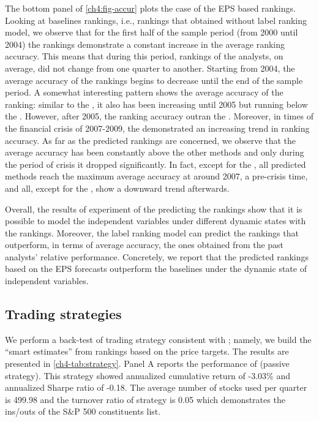 \documentclass[a4paper,twoside,12pt,openright,notitlepage]{report}\usepackage[]{graphicx}\usepackage[]{color}
\begin{document}
The bottom panel of \ref{ch4:fig-accur} plots the case of the EPS based rankings. Looking at baselines rankings, i.e., rankings that obtained without label ranking model, we observe that for the first half of the sample period (from 2000 until 2004) the \naive{} rankings  demonstrate a constant increase in the average ranking accuracy. This means that during this period, rankings of the analysts, on average, did not change from one quarter to another. Starting from 2004, the average accuracy of the \naive{} rankings begins to decrease until the end of the sample period. A somewhat interesting pattern shows the average accuracy of the  ranking: similar to the \naive{}, it also has been increasing until 2005 but running below the \naive{}. However, after 2005, the  ranking accuracy outran the \naive{}. Moreover, in times of the financial crisis of 2007-2009, the  demonstrated an increasing trend in ranking accuracy. As far as the predicted rankings are concerned, we observe that the \diff{} average accuracy has been constantly above the other methods and only during the period of crisis it dropped significantly. In fact, except for the \random{}, all predicted methods reach the maximum average accuracy at around 2007, a pre-crisis time, and all, except for the , show a downward trend afterwards.

Overall, the results of experiment of the predicting the rankings show that it is possible to model the independent variables under different dynamic states with the rankings. Moreover, the label ranking model can predict the rankings that outperform, in terms of average accuracy, the ones  obtained from the past analysts' relative performance. Concretely, we report that the predicted rankings based on the EPS forecasts outperform the baselines under the \diff{} dynamic state of independent variables.




\subsection{Trading strategies}

We perform  a back-test of  trading  strategy consistent with  \cite{aiguzhinov2015a}; namely, we build the ``smart estimates'' from rankings based on the  price targets. The results are presented in \ref{ch4-tab:strategy}. Panel A reports the performance of \Market{} (passive strategy). This strategy showed annualized cumulative return of -3.03\% and annualized Sharpe ratio of -0.18. The average number of stocks used per quarter is 499.98 and the turnover ratio of strategy is 0.05 which demonstrates the ins/outs of the S\&P 500 constituents list.
\end{document}
